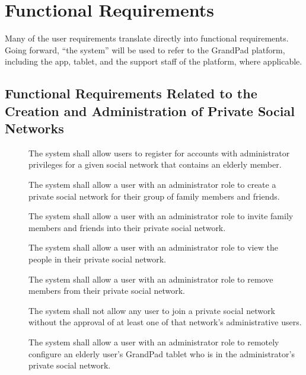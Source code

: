 \section*{Functional Requirements}

Many of the user requirements translate directly into functional requirements.
Going forward, ``the system'' will be used to refer to the GrandPad platform,
    including the app, tablet, and the support staff of the platform, where
    applicable.

\subsection*{Functional Requirements Related to the Creation and Administration of Private Social Networks}

\begin{description}
    \item[\textbf{\showfuncnetcounter}]
        The system shall allow users to register for accounts with
            administrator privileges for a given social network that contains an
            elderly member.
    \item[\textbf{\showfuncnetcounter}]
        The system shall allow a user with an administrator role to create a
            private social network for their group of family members and
            friends.
    \item[\textbf{\showfuncnetcounter}]
        The system shall allow a user with an administrator role to invite
            family members and friends into their private social network.
    \item[\textbf{\showfuncnetcounter}]
        The system shall allow a user with an administrator role to view the
            people in their private social network.
    \item[\textbf{\showfuncnetcounter}]
        The system shall allow a user with an administrator role to remove
            members from their private social network.
    \item[\textbf{\showfuncnetcounter}]
        The system shall not allow any user to join a private social network
            without the approval of at least one of that network's
            administrative users.
    \item[\textbf{\showfuncnetcounter}]
        The system shall allow a user with an administrator role to remotely
            configure an elderly user's GrandPad tablet who is in the
            administrator's private social network.
\end{description}


